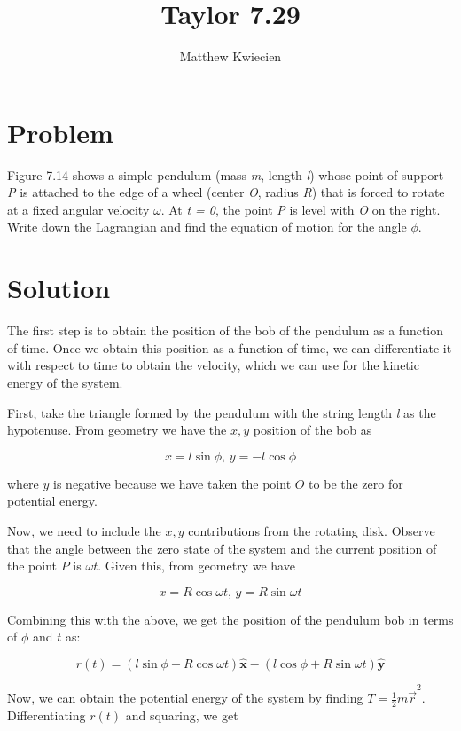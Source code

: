 \documentclass{article}
\title{Taylor 7.29}
\author{Matthew Kwiecien}
\newcommand{\uvec}[1]{\boldsymbol{\hat{\textbf{#1}}}}
\begin{document}
\maketitle

\section{Problem}
Figure 7.14 shows a simple pendulum (mass \textit{m}, length \textit{l}) whose point of support \textit{P} is attached to the edge of a wheel (center \textit{O}, radius \textit{R}) that is forced to rotate at a fixed angular velocity $\omega$.  At \textit{t = 0}, the point \textit{P} is level with \textit{O} on the right.  Write down the Lagrangian and find the equation of motion for the angle $\phi$.

\section{Solution}

The first step is to obtain the position of the bob of the pendulum as a function of time.  Once we obtain this position as a function of time, we can differentiate it with respect to time to obtain the velocity, which we can use for the kinetic energy of the system.

First, take the triangle formed by the pendulum with the string length \textit{l} as the hypotenuse.  From geometry we have the $x,y$ position of the bob as 

$$
x = l\sin\phi \textrm{, } y= -l\cos\phi
$$

where $y$ is negative because we have taken the point $O$ to be the zero for potential energy.

Now, we need to include the $x,y$ contributions from the rotating disk.  Observe that the angle between the zero state of the system and the current position of the point $P$ is $\omega t$.  Given this, from geometry we have

$$
x = R\cos\omega t \textrm{, } y = R\sin\omega t
$$

Combining this with the above, we get the position of the pendulum bob in terms of $\phi$ and $t$ as:

$$
r(t) = (l\sin\phi + R\cos\omega t) \uvec{x} - (l\cos\phi + R\sin\omega t) \uvec{y}
$$

Now, we can obtain the potential energy of the system by finding $T=\frac{1}{2}m\dot{\vec{r}}^2$. Differentiating $r(t)$ and squaring, we get
\end{document}
